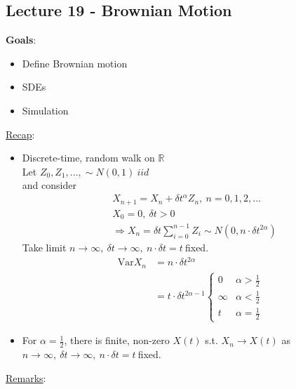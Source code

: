 \documentclass[12pt, letterpaper]{article}
\begin{document}
\subsection{Lecture 19 - Brownian Motion}
\textbf{Goals}:
\begin{itemize}
    \item Define Brownian motion
    \item SDEs
    \item Simulation
\end{itemize}
\underline{Recap}:
\begin{itemize}
    \item Discrete-time, random walk on $\mathbb{R}$ \\
    Let $Z_0, Z_1,..., \sim N(0,1)\ iid$ \\
    and consider 
    \begin{align*}
        &X_{n+1} = X_n + \delta t^\alpha Z_n,\ n = 0,1,2,\dots \\
        &X_0 = 0,\ \delta t > 0 \\
        &\Rightarrow X_n = \delta t \sum_{i=0}^{n-1} Z_i \sim N(0,n\cdot \delta t^{2\alpha})
    \end{align*}
    Take limit $n \rightarrow \infty,\ \delta t \rightarrow \infty,\ n\cdot \delta t = t\ $fixed. \\
    \begin{align*}
        \text{Var}X_n &= n \cdot \delta t^{2\alpha} \\
        &= t \cdot \delta t ^{2\alpha -1} \begin{cases}
            0 & \alpha > \frac 12 \\
            \infty & \alpha < \frac 12 \\
            t & \alpha = \frac 12
        \end{cases}
    \end{align*}
    \item For $\alpha = \frac 12$, there is finite, non-zero $X(t)$ s.t. $X_n \rightarrow X(t)$
    as $n \rightarrow \infty,\ \delta t \rightarrow \infty,\ n\cdot \delta t = t\ $fixed.
\end{itemize}
\underline{Remarks}:
\end{document}
